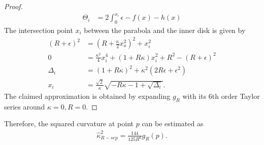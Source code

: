 \begin{proof}
\begin{align*}
	\Theta_i &= 2\int_{0}^{x_i}{\epsilon - f(x) - h(x)}	
\end{align*}
%
The intersection point $x_i$ between the parabola and the inner disk is given by
\begin{align*}
	(R+\epsilon)^2 &= (R+\frac{\kappa}{2}x_o^2)^2 + x_i^2\\
	0 &= \frac{\kappa^2}{4}x_i^4 + (1+R\kappa)x_i^2 + R^2 - (R+\epsilon)^2	\\
\Delta_i &= (1+R\kappa)^2 + \kappa^2(2R\epsilon + \epsilon^2)\\
x_i &= \frac{\sqrt{2}}{\kappa}\sqrt{-R\kappa-1+\sqrt{\Delta_i}}.
\end{align*}
%
The claimed approximation is obtained by expanding $g_R$ with its  6th order Taylor series around $\kappa=0,R=0$.
\end{proof}

Therefore, the squared curvature at point $p$ can be estimated as
\begin{align*}
	\hat{\kappa}_{R-sep} ^2 = \frac{144}{125R^6}g_R(p) .
\end{align*}